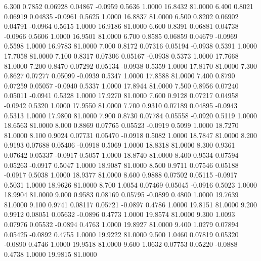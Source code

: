    6.300   0.7852   0.06928   0.04867  -0.0959   0.5636   1.0000  16.8432  81.0000
   6.400   0.8021   0.06919   0.04835  -0.0961   0.5625   1.0000  16.8837  81.0000
   6.500   0.8202   0.06902   0.04791  -0.0964   0.5615   1.0000  16.9186  81.0000
   6.600   0.8391   0.06881   0.04738  -0.0966   0.5606   1.0000  16.9501  81.0000
   6.700   0.8585   0.06859   0.04679  -0.0969   0.5598   1.0000  16.9783  81.0000
   7.000   0.8172   0.07316   0.05194  -0.0938   0.5391   1.0000  17.7058  81.0000
   7.100   0.8317   0.07306   0.05167  -0.0938   0.5373   1.0000  17.7668  81.0000
   7.200   0.8470   0.07292   0.05134  -0.0938   0.5359   1.0000  17.8170  81.0000
   7.300   0.8627   0.07277   0.05099  -0.0939   0.5347   1.0000  17.8588  81.0000
   7.400   0.8790   0.07259   0.05057  -0.0940   0.5337   1.0000  17.8944  81.0000
   7.500   0.8956   0.07240   0.05011  -0.0941   0.5328   1.0000  17.9270  81.0000
   7.600   0.9128   0.07217   0.04958  -0.0942   0.5320   1.0000  17.9550  81.0000
   7.700   0.9310   0.07189   0.04895  -0.0943   0.5313   1.0000  17.9800  81.0000
   7.900   0.8730   0.07784   0.05558  -0.0920   0.5119   1.0000  18.6563  81.0000
   8.000   0.8869   0.07765   0.05523  -0.0919   0.5099   1.0000  18.7270  81.0000
   8.100   0.9024   0.07731   0.05470  -0.0918   0.5082   1.0000  18.7847  81.0000
   8.200   0.9193   0.07688   0.05406  -0.0918   0.5069   1.0000  18.8318  81.0000
   8.300   0.9361   0.07642   0.05337  -0.0917   0.5057   1.0000  18.8740  81.0000
   8.400   0.9534   0.07594   0.05263  -0.0917   0.5047   1.0000  18.9087  81.0000
   8.500   0.9711   0.07546   0.05188  -0.0917   0.5038   1.0000  18.9377  81.0000
   8.600   0.9888   0.07502   0.05115  -0.0917   0.5031   1.0000  18.9626  81.0000
   8.700   1.0054   0.07469   0.05045  -0.0916   0.5023   1.0000  18.9904  81.0000
   9.000   0.9583   0.08169   0.05795  -0.0899   0.4800   1.0000  19.7639  81.0000
   9.100   0.9741   0.08117   0.05721  -0.0897   0.4786   1.0000  19.8151  81.0000
   9.200   0.9912   0.08051   0.05632  -0.0896   0.4773   1.0000  19.8574  81.0000
   9.300   1.0093   0.07976   0.05532  -0.0894   0.4763   1.0000  19.8927  81.0000
   9.400   1.0279   0.07894   0.05425  -0.0892   0.4755   1.0000  19.9222  81.0000
   9.500   1.0460   0.07819   0.05320  -0.0890   0.4746   1.0000  19.9518  81.0000
   9.600   1.0632   0.07753   0.05220  -0.0888   0.4738   1.0000  19.9815  81.0000
